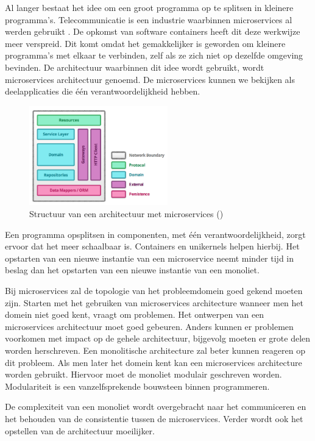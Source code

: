 Al langer bestaat het idee om een groot programma op te splitsen in kleinere programma's. Telecommunicatie is een industrie waarbinnen microservices al werden gebruikt \cite{griffin_survey_2007}. De opkomst van software containers heeft dit deze werkwijze meer verspreid. Dit komt omdat het gemakkelijker is geworden om kleinere programma's met elkaar te verbinden, zelf als ze zich niet op dezelfde omgeving bevinden. De architectuur waarbinnen dit idee wordt gebruikt, wordt microservices architectuur genoemd. De microservices kunnen we bekijken als deelapplicaties die één verantwoordelijkheid hebben.

\begin{figure}
    \centering
    \includegraphics[width=6cm]{img/microservice_structure_example}
    \caption[Structuur architectuur microservices]{Structuur van een architectuur met microservices (\cite{toby_clemson_testing_2014}) }
    \label{fig:microservice_structure_example}
\end{figure}


Een programma opsplitsen in componenten, met één verantwoordelijkheid, zorgt ervoor dat het meer schaalbaar is. Containers en unikernels helpen hierbij. Het opstarten van een nieuwe instantie van een microservice neemt minder tijd in beslag dan het opstarten van een nieuwe instantie van een monoliet.

Bij microservices zal de topologie van het probleemdomein goed gekend moeten zijn. Starten met het gebruiken van microservices architecture wanneer men het domein niet goed kent, vraagt om problemen. Het ontwerpen van een microservices architectuur moet goed gebeuren. Anders kunnen er problemen voorkomen met impact op de gehele architectuur, bijgevolg moeten er grote delen worden herschreven. Een monolitische architecture zal beter kunnen reageren op dit probleem. Als men later het domein kent kan een microservices architecture worden gebruikt. Hiervoor moet de monoliet modulair geschreven worden. Modulariteit is een vanzelfsprekende bouwsteen binnen programmeren.

De complexiteit van een monoliet wordt overgebracht naar het communiceren en het behouden van de consistentie tussen de microservices. Verder wordt ook het opstellen van de architectuur moeilijker.

